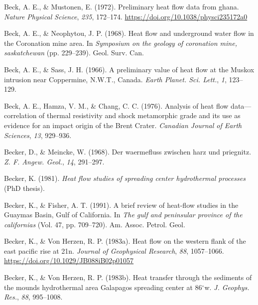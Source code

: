 \begin{CSLReferences}{1}{1}
\leavevmode{}%
Beck, A. E., \& Mustonen, E. (1972). Preliminary heat flow data from ghana. \emph{Nature Physical Science}, \emph{235}, 172--174. \url{https://doi.org/10.1038/physci235172a0}

\leavevmode{}%
Beck, A. E., \& Neophytou, J. P. (1968). Heat flow and underground water flow in the {Coronation} mine area. In \emph{Symposium on the geology of coronation mine, saskatchewan} (pp. 229--239). Geol. Surv. Can.

\leavevmode{}%
Beck, A. E., \& Sass, J. H. (1966). A preliminary value of heat flow at the {Muskox} intrusion near {Coppermine, N.W.T., Canada}. \emph{Earth Planet. Sci. Lett.}, \emph{1}, 123--129.

\leavevmode{}%
Beck, A. E., Hamza, V. M., \& Chang, C. C. (1976). Analysis of heat flow data---correlation of thermal resistivity and shock metamorphic grade and its use as evidence for an impact origin of the {Brent Crater}. \emph{Canadian Journal of Earth Sciences}, \emph{13}, 929--936.

\leavevmode{}%
Becker, D., \& Meincke, W. (1968). Der waermefluss zwischen harz und priegnitz. \emph{Z. F. Angew. Geol.}, \emph{14}, 291--297.

\leavevmode{}%
Becker, K. (1981). \emph{Heat flow studies of spreading center hydrothermal processes} (PhD thesis).

\leavevmode{}%
Becker, K., \& Fisher, A. T. (1991). A brief review of heat-flow studies in the {Guaymas Basin, Gulf of California}. In \emph{The gulf and peninsular province of the californias} (Vol. 47, pp. 709--720). Am. Assoc. Petrol. Geol.

\leavevmode{}%
Becker, K., \& Von Herzen, R. P. (1983a). Heat flow on the western flank of the east pacific rise at 21\textdegree{}n. \emph{Journal of Geophysical Research}, \emph{88}, 1057--1066. \url{https://doi.org/10.1029/JB088iB02p01057}

\leavevmode{}%
Becker, K., \& Von Herzen, R. P. (1983b). Heat transfer through the sediments of the mounds hydrothermal area {Galapagos} spreading center at 86\(^\circ\)w. \emph{J. Geophys. Res.}, \emph{88}, 995--1008.


\end{CSLReferences}

